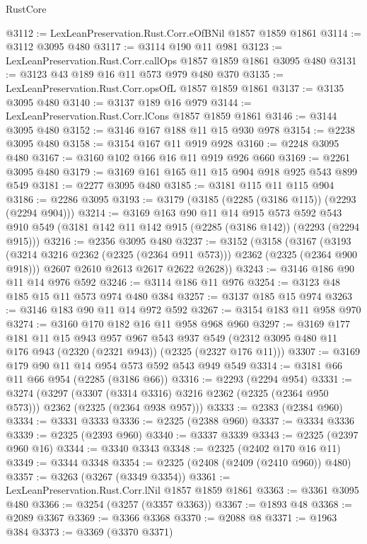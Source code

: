 \begin{lexlean}{RustCore}
\begin{coremodule}
@3112 := LexLeanPreservation.Rust.Corr.eOfBNil @1857 @1859 @1861
@3114 := @3112 @3095 @480
@3117 := @3114 @190 @11 @981
@3123 := LexLeanPreservation.Rust.Corr.callOps @1857 @1859 @1861 @3095 @480
@3131 := @3123 @43 @189 @16 @11 @573 @979 @480 @370
@3135 := LexLeanPreservation.Rust.Corr.opsOfL @1857 @1859 @1861
@3137 := @3135 @3095 @480
@3140 := @3137 @189 @16 @979
@3144 := LexLeanPreservation.Rust.Corr.lCons @1857 @1859 @1861
@3146 := @3144 @3095 @480
@3152 := @3146 @167 @188 @11 @15 @930 @978
@3154 := @2238 @3095 @480
@3158 := @3154 @167 @11 @919 @928
@3160 := @2248 @3095 @480
@3167 := @3160 @102 @166 @16 @11 @919 @926 @660
@3169 := @2261 @3095 @480
@3179 := @3169 @161 @165 @11 @15 @904 @918 @925 @543 @899 @549
@3181 := @2277 @3095 @480
@3185 := @3181 @115 @11 @115 @904
@3186 := @2286 @3095
@3193 := @3179 (@3185 (@2285 (@3186 @115)) (@2293 (@2294 @904)))
@3214 := @3169
    @163
    @90
    @11
    @14
    @915
    @573
    @592
    @543
    @910
    @549
    (@3181 @142 @11 @142 @915 (@2285 (@3186 @142)) (@2293 (@2294 @915)))
@3216 := @2356 @3095 @480
@3237 := @3152
    (@3158
      (@3167
        (@3193 (@3214 @3216 @2362 (@2325 (@2364 @911 @573))) @2362 (@2325 (@2364 @900 @918)))
        @2607
        @2610
        @2613
        @2617
        @2622
        @2628))
@3243 := @3146 @186 @90 @11 @14 @976 @592
@3246 := @3114 @186 @11 @976
@3254 := @3123 @48 @185 @15 @11 @573 @974 @480 @384
@3257 := @3137 @185 @15 @974
@3263 := @3146 @183 @90 @11 @14 @972 @592
@3267 := @3154 @183 @11 @958 @970
@3274 := @3160 @170 @182 @16 @11 @958 @968 @960
@3297 := @3169
    @177
    @181
    @11
    @15
    @943
    @957
    @967
    @543
    @937
    @549
    (@2312 @3095 @480 @11 @176 @943 (@2320 (@2321 @943)) (@2325 (@2327 @176 @11)))
@3307 := @3169 @179 @90 @11 @14 @954 @573 @592 @543 @949 @549
@3314 := @3181 @66 @11 @66 @954 (@2285 (@3186 @66))
@3316 := @2293 (@2294 @954)
@3331 := @3274
    (@3297
      (@3307 (@3314 @3316) @3216 @2362 (@2325 (@2364 @950 @573)))
      @2362
      (@2325 (@2364 @938 @957)))
@3333 := @2383 (@2384 @960)
@3334 := @3331 @3333
@3336 := @2325 (@2388 @960)
@3337 := @3334 @3336
@3339 := @2325 (@2393 @960)
@3340 := @3337 @3339
@3343 := @2325 (@2397 @960 @16)
@3344 := @3340 @3343
@3348 := @2325 (@2402 @170 @16 @11)
@3349 := @3344 @3348
@3354 := @2325 (@2408 (@2409 (@2410 @960)) @480)
@3357 := @3263 (@3267 (@3349 @3354))
@3361 := LexLeanPreservation.Rust.Corr.lNil @1857 @1859 @1861
@3363 := @3361 @3095 @480
@3366 := @3254 (@3257 (@3357 @3363))
@3367 := @1893 @48
@3368 := @2089 @3367
@3369 := @3366 @3368
@3370 := @2088 @8
@3371 := @1963 @384
@3373 := @3369 (@3370 @3371)

\end{coremodule}
\end{lexlean}
